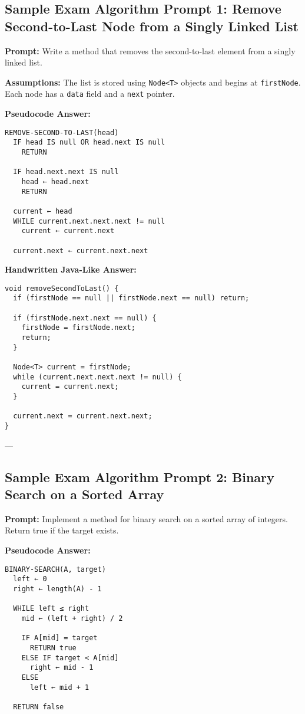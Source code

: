 \documentclass[11pt]{article}
\begin{document}
\subsection*{Sample Exam Algorithm Prompt 1: Remove Second-to-Last Node from a Singly Linked List}

\textbf{Prompt:} Write a method that removes the second-to-last element from a singly linked list.

\textbf{Assumptions:} The list is stored using \texttt{Node<T>} objects and begins at \texttt{firstNode}. Each node has a \texttt{data} field and a \texttt{next} pointer.

\vspace{1em}
\textbf{Pseudocode Answer:}
\begin{verbatim}
REMOVE-SECOND-TO-LAST(head)
  IF head IS null OR head.next IS null
    RETURN

  IF head.next.next IS null
    head ← head.next
    RETURN

  current ← head
  WHILE current.next.next.next != null
    current ← current.next

  current.next ← current.next.next
\end{verbatim}

\vspace{1em}
\textbf{Handwritten Java-Like Answer:}
\begin{verbatim}
void removeSecondToLast() {
  if (firstNode == null || firstNode.next == null) return;

  if (firstNode.next.next == null) {
    firstNode = firstNode.next;
    return;
  }

  Node<T> current = firstNode;
  while (current.next.next.next != null) {
    current = current.next;
  }

  current.next = current.next.next;
}
\end{verbatim}

---

\subsection*{Sample Exam Algorithm Prompt 2: Binary Search on a Sorted Array}

\textbf{Prompt:} Implement a method for binary search on a sorted array of integers. Return true if the target exists.

\vspace{1em}
\textbf{Pseudocode Answer:}
\begin{verbatim}
BINARY-SEARCH(A, target)
  left ← 0
  right ← length(A) - 1

  WHILE left ≤ right
    mid ← (left + right) / 2

    IF A[mid] = target
      RETURN true
    ELSE IF target < A[mid]
      right ← mid - 1
    ELSE
      left ← mid + 1

  RETURN false
\end{verbatim}
\end{document}
